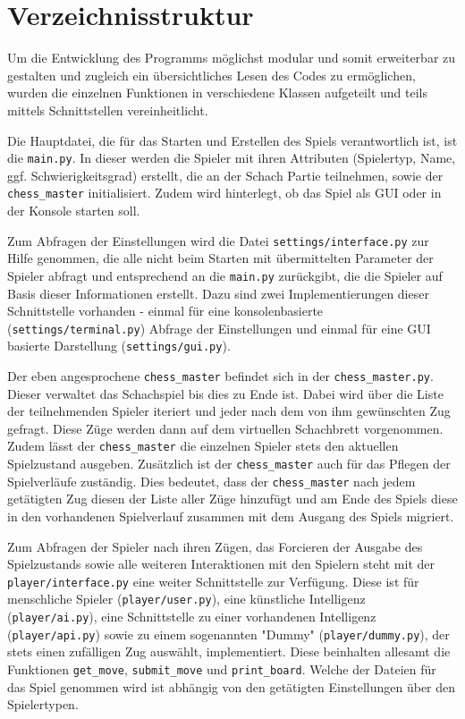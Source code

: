     \section{Verzeichnisstruktur}\label{verzeichnisstruktur}

Um die Entwicklung des Programms möglichst modular und somit erweiterbar
zu gestalten und zugleich ein übersichtliches Lesen des Codes zu
ermöglichen, wurden die einzelnen Funktionen in verschiedene Klassen
aufgeteilt und teils mittels Schnittstellen vereinheitlicht.

Die Hauptdatei, die für das Starten und Erstellen des Spiels
verantwortlich ist, ist die \texttt{main.py}. In dieser werden die
Spieler mit ihren Attributen (Spielertyp, Name, ggf. Schwierigkeitsgrad)
erstellt, die an der Schach Partie teilnehmen, sowie der
\texttt{chess\_master} initialisiert. Zudem wird hinterlegt, ob das
Spiel als GUI oder in der Konsole starten soll.

Zum Abfragen der Einstellungen wird die Datei
\texttt{settings/interface.py} zur Hilfe genommen, die alle nicht beim
Starten mit übermittelten Parameter der Spieler abfragt und entsprechend
an die \texttt{main.py} zurückgibt, die die Spieler auf Basis dieser
Informationen erstellt. Dazu sind zwei Implementierungen dieser
Schnittstelle vorhanden - einmal für eine konsolenbasierte
(\texttt{settings/terminal.py}) Abfrage der Einstellungen und einmal für
eine GUI basierte Darstellung (\texttt{settings/gui.py}).

Der eben angesprochene \texttt{chess\_master} befindet sich in der
\texttt{chess\_master.py}. Dieser verwaltet das Schachspiel bis dies zu
Ende ist. Dabei wird über die Liste der teilnehmenden Spieler iteriert
und jeder nach dem von ihm gewünschten Zug gefragt. Diese Züge werden
dann auf dem virtuellen Schachbrett vorgenommen. Zudem lässt der
\texttt{chess\_master} die einzelnen Spieler stets den aktuellen
Spielzustand ausgeben. Zusätzlich ist der \texttt{chess\_master} auch
für das Pflegen der Spielverläufe zuständig. Dies bedeutet, dass der
\texttt{chess\_master} nach jedem getätigten Zug diesen der Liste aller
Züge hinzufügt und am Ende des Spiels diese in den vorhandenen
Spielverlauf zusammen mit dem Ausgang des Spiels migriert.

Zum Abfragen der Spieler nach ihren Zügen, das Forcieren der Ausgabe des
Spielzustands sowie alle weiteren Interaktionen mit den Spielern steht
mit der \texttt{player/interface.py} eine weiter Schnittstelle zur
Verfügung. Diese ist für menschliche Spieler (\texttt{player/user.py}),
eine künstliche Intelligenz (\texttt{player/ai.py}), eine Schnittstelle
zu einer vorhandenen Intelligenz (\texttt{player/api.py}) sowie zu einem
sogenannten "Dummy" (\texttt{player/dummy.py}), der stets einen
zufälligen Zug auswählt, implementiert. Diese beinhalten allesamt die
Funktionen \texttt{get\_move}, \texttt{submit\_move} und
\texttt{print\_board}. Welche der Dateien für das Spiel genommen wird
ist abhängig von den getätigten Einstellungen über den Spielertypen.

